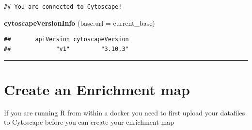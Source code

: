 \documentclass[
]{book}
\newenvironment{Shaded}{\begin{snugshade}}{\end{snugshade}}
\newcommand{\AttributeTok}[1]{\textcolor[rgb]{0.13,0.29,0.53}{#1}}
\newcommand{\FunctionTok}[1]{\textcolor[rgb]{0.13,0.29,0.53}{\textbf{#1}}}
\newcommand{\NormalTok}[1]{#1}
\begin{document}
\begin{verbatim}
## You are connected to Cytoscape!
\end{verbatim}

\begin{Shaded}
\begin{Highlighting}[]
\FunctionTok{cytoscapeVersionInfo}\NormalTok{ (}\AttributeTok{base.url =}\NormalTok{ current\_base)}
\end{Highlighting}
\end{Shaded}

\begin{verbatim}
##       apiVersion cytoscapeVersion 
##             "v1"         "3.10.3"
\end{verbatim}

\begin{center}\rule{0.5\linewidth}{0.5pt}\end{center}

\section{Create an Enrichment map}\label{create-an-enrichment-map-1}

If you are running R from within a docker you need to first upload your datafiles to Cytoscape before you can create your enrichment map
\end{document}
